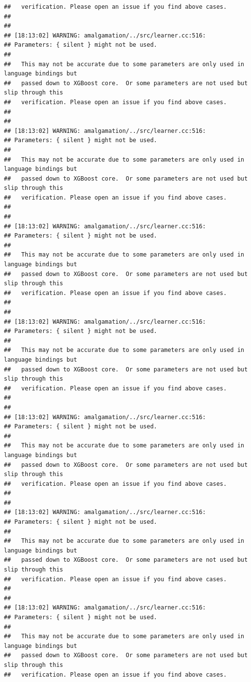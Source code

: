 \documentclass[AMS,STIX2COL]{WileyNJD-v2}\usepackage[]{graphicx}\usepackage[]{color}
\makeatletter
\newenvironment{kframe}{%
 \def\at@end@of@kframe{}%
 \ifinner\ifhmode%
  \def\at@end@of@kframe{\end{minipage}}%
  \begin{minipage}{\columnwidth}%
 \fi\fi%
 \def\FrameCommand##1{\hskip\@totalleftmargin \hskip-\fboxsep
 \colorbox{shadecolor}{##1}\hskip-\fboxsep
     \hskip-\linewidth \hskip-\@totalleftmargin \hskip\columnwidth}%
 \MakeFramed {\advance\hsize-\width
   \@totalleftmargin\z@ \linewidth\hsize
   \@setminipage}}%
 {\par\unskip\endMakeFramed%
 \at@end@of@kframe}
\newenvironment{knitrout}{}{} %
\makeatother
\begin{document}
\begin{knitrout}
\begin{kframe}
\begin{verbatim}
##   verification. Please open an issue if you find above cases.
## 
## 
## [18:13:02] WARNING: amalgamation/../src/learner.cc:516: 
## Parameters: { silent } might not be used.
## 
##   This may not be accurate due to some parameters are only used in language bindings but
##   passed down to XGBoost core.  Or some parameters are not used but slip through this
##   verification. Please open an issue if you find above cases.
## 
## 
## [18:13:02] WARNING: amalgamation/../src/learner.cc:516: 
## Parameters: { silent } might not be used.
## 
##   This may not be accurate due to some parameters are only used in language bindings but
##   passed down to XGBoost core.  Or some parameters are not used but slip through this
##   verification. Please open an issue if you find above cases.
## 
## 
## [18:13:02] WARNING: amalgamation/../src/learner.cc:516: 
## Parameters: { silent } might not be used.
## 
##   This may not be accurate due to some parameters are only used in language bindings but
##   passed down to XGBoost core.  Or some parameters are not used but slip through this
##   verification. Please open an issue if you find above cases.
## 
## 
## [18:13:02] WARNING: amalgamation/../src/learner.cc:516: 
## Parameters: { silent } might not be used.
## 
##   This may not be accurate due to some parameters are only used in language bindings but
##   passed down to XGBoost core.  Or some parameters are not used but slip through this
##   verification. Please open an issue if you find above cases.
## 
## 
## [18:13:02] WARNING: amalgamation/../src/learner.cc:516: 
## Parameters: { silent } might not be used.
## 
##   This may not be accurate due to some parameters are only used in language bindings but
##   passed down to XGBoost core.  Or some parameters are not used but slip through this
##   verification. Please open an issue if you find above cases.
## 
## 
## [18:13:02] WARNING: amalgamation/../src/learner.cc:516: 
## Parameters: { silent } might not be used.
## 
##   This may not be accurate due to some parameters are only used in language bindings but
##   passed down to XGBoost core.  Or some parameters are not used but slip through this
##   verification. Please open an issue if you find above cases.
## 
## 
## [18:13:02] WARNING: amalgamation/../src/learner.cc:516: 
## Parameters: { silent } might not be used.
## 
##   This may not be accurate due to some parameters are only used in language bindings but
##   passed down to XGBoost core.  Or some parameters are not used but slip through this
##   verification. Please open an issue if you find above cases.

\end{verbatim}
\end{kframe}
\end{knitrout}
\end{document}
